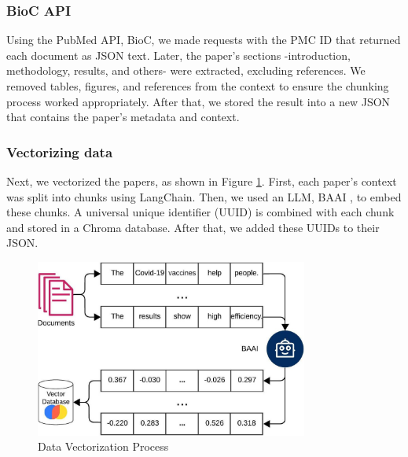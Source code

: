 \subsubsection{BioC API}
Using the PubMed API, BioC, we made requests with the PMC ID that returned each document as JSON text. Later, the paper's sections -introduction, methodology, results, and others- were extracted, excluding references. We removed tables, figures, and references from the context to ensure the chunking process worked appropriately. After that, we stored the result into a new JSON that contains the paper's metadata and context. 

\subsubsection{Vectorizing data}
Next, we vectorized the papers, as shown in Figure \ref{fig:vector}. First, each paper’s context was split into chunks using LangChain. Then, we used an LLM, BAAI \cite{bge_embedding}, to embed these chunks. A universal unique identifier (UUID) is combined with each chunk and stored in a Chroma database. After that, we added these UUIDs to their JSON. 

\begin{figure}[!htb]
	\begin{center}
		\includegraphics[width=0.8\textwidth]{figures/Data_vectorization.jpeg} 
	\end{center}
	\caption{Data Vectorization Process} 
	\label{fig:vector}
\end{figure}


